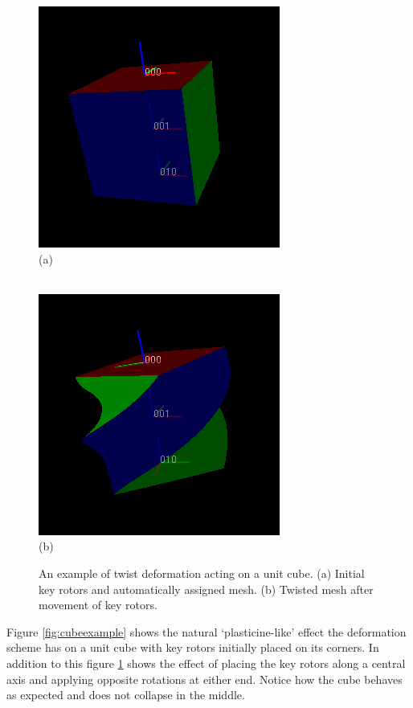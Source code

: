 \begin{figure}[p]
\centering
\includegraphics[height=0.37\textheight]{twist_cube_before} \\
\noindent (a) \\ \rule{0pt}{\parskip} \\
\includegraphics[height=0.37\textheight]{twist_cube_after} \\
\noindent (b) 
\caption{\label{fig:twistcubeexample}An example of twist deformation acting on a unit cube.
  (a) Initial key rotors and automatically assigned mesh. 
  (b) Twisted mesh after movement of key rotors.} 
\end{figure}

Figure \ref{fig:cubeexample} shows the natural `plasticine-like' effect the deformation
scheme has on a unit cube with key rotors initially placed on its corners. In addition to
this figure \ref{fig:twistcubeexample} shows the effect of placing the key rotors along
a central axis and applying opposite rotations at either end. Notice how the cube behaves as
expected and does not collapse in the middle.


